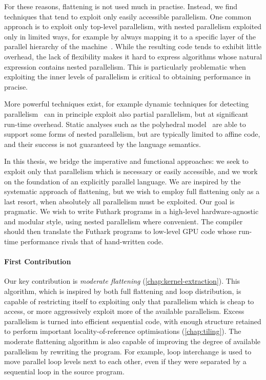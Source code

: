 For these reasons, flattening is not used much in practise.  Instead,
we find techniques that tend to exploit only easily accessible
parallelism.  One common approach is to exploit only top-level
parallelism, with nested parallelism exploited only in limited ways,
for example by always mapping it to a specific layer of the parallel
hierarchy of the
machine~\cite{grelck2006sac,DeliteNestedPar,mcdonell2013optimising,Steuwer:2015:GPP:2858949.2784754}.
While the resulting code tends to exhibit little overhead, the lack of
flexibility makes it hard to express algorithms whose natural
expression contains nested parallelism.  This is particularly
problematic when exploiting the inner levels of parallelism is
critical to obtaining performance in pracise.

More powerful techniques exist, for example dynamic techniques for
detecting parallelism~\cite{SpLSC} can in principle exploit also
partial parallelism, but at significant run-time overhead.  Static
analyses such as the polyhedral
model~\cite{PolyhedralOpt,RedPencil,PolyPluto2,chatarasi2015polyhedral}
are able to support some forms of nested parallelism, but are
typically limited to affine code, and their success is not guaranteed
by the language semantics.

In this thesis, we bridge the imperative and functional approaches: we
seek to exploit only that parallelism which is necessary or easily
accessible, and we work on the foundation of an explicitly parallel
language.    We are inspired by the systematic approach of flattening,
but we wish to employ full flattening only as a last resort, when
absolutely all parallelism must be exploited.  Our goal is pragmatic.
We wish to write Futhark programs in a high-level hardware-agnostic
and modular style, using nested parallelism where convenient.  The
compiler should then translate the Futhark programs to low-level GPU
code whose run-time performance rivals that of hand-written code.

\paragraph{First Contribution}

Our key contribution is \textit{moderate flattening}
(\cref{chap:kernel-extraction}).  This algorithm, which is inspired by
both full flattening and loop distribution, is capable of restricting
itself to exploiting only that parallelism which is cheap to access,
or more aggressively exploit more of the available parallelism.
Excess parallelism is turned into efficient sequential code, with
enough structure retained to perform important locality-of-reference
optimisations (\cref{chap:tiling}).  The moderate flattening algorithm
is also capable of improving the degree of available parallelism by
rewriting the program.  For example, loop interchange is used to move
parallel loop levels next to each other, even if they were separated
by a sequential loop in the source program.

